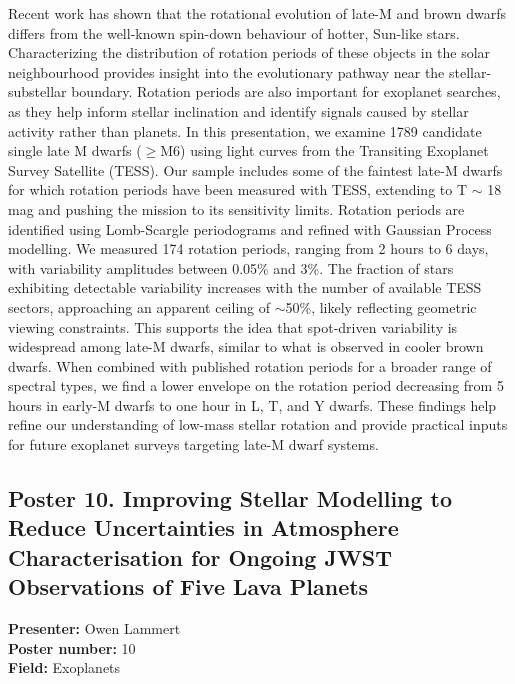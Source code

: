 Recent work has shown that the rotational evolution of late-M and brown dwarfs differs from the well-known spin-down behaviour of hotter, Sun-like stars. Characterizing the distribution of rotation periods of these objects in the solar neighbourhood provides insight into the evolutionary pathway near the stellar-substellar boundary. Rotation periods are also important for exoplanet searches, as they help inform stellar inclination and identify signals caused by stellar activity rather than planets. In this presentation, we examine 1789 candidate single late M dwarfs ($\geq$M6) using light curves from the Transiting Exoplanet Survey Satellite (TESS). Our sample includes some of the faintest late-M dwarfs for which rotation periods have been measured with TESS, extending to T $\sim$ 18 mag and pushing the mission to its sensitivity limits. Rotation periods are identified using Lomb-Scargle periodograms and refined with Gaussian Process modelling. We measured 174 rotation periods, ranging from 2 hours to 6 days, with variability amplitudes between 0.05\% and 3\%. The fraction of stars exhibiting detectable variability increases with the number of available TESS sectors, approaching an apparent ceiling of $\sim$50\%, likely reflecting geometric viewing constraints. This supports the idea that spot-driven variability is widespread among late-M dwarfs, similar to what is observed in cooler brown dwarfs. When combined with published rotation periods for a broader range of spectral types, we find a lower envelope on the rotation period decreasing from 5 hours in early-M dwarfs to one hour in L, T, and Y dwarfs. These findings help refine our understanding of low-mass stellar rotation and provide practical inputs for future exoplanet surveys targeting late-M dwarf systems.

\hypertarget{poster-abstract-talk-232}{}\label{poster-abstract-page-talk-232}
\subsection*{Poster 10. Improving Stellar Modelling to Reduce Uncertainties in Atmosphere Characterisation for Ongoing JWST Observations of Five Lava Planets}
\textbf{Presenter:} Owen Lammert\\
\textbf{Poster number:} 10\\
\textbf{Field:} Exoplanets

